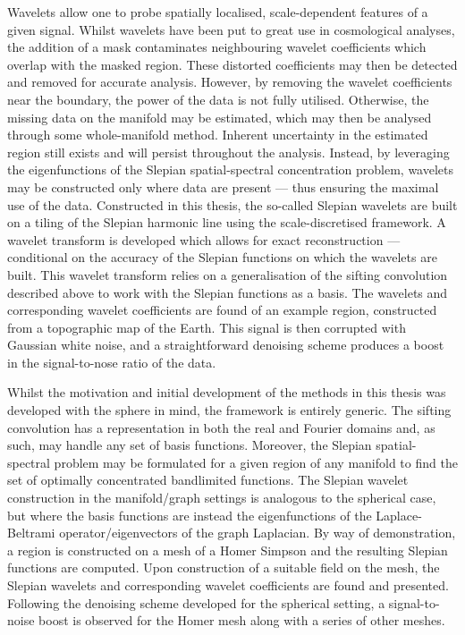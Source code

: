 Wavelets allow one to probe spatially localised, scale-dependent features of a given signal.
Whilst wavelets have been put to great use in cosmological analyses, the addition of a mask contaminates neighbouring wavelet coefficients which overlap with the masked region.
These distorted coefficients may then be detected and removed for accurate analysis.
However, by removing the wavelet coefficients near the boundary, the power of the data is not fully utilised.
Otherwise, the missing data on the manifold may be estimated, which may then be analysed through some whole-manifold method.
Inherent uncertainty in the estimated region still exists and will persist throughout the analysis.
Instead, by leveraging the eigenfunctions of the Slepian spatial-spectral concentration problem, wavelets may be constructed only where data are present --- thus ensuring the maximal use of the data.
Constructed in this thesis, the so-called Slepian wavelets are built on a tiling of the Slepian harmonic line using the scale-discretised framework.
A wavelet transform is developed which allows for exact reconstruction --- conditional on the accuracy of the Slepian functions on which the wavelets are built.
This wavelet transform relies on a generalisation of the sifting convolution described above to work with the Slepian functions as a basis.
The wavelets and corresponding wavelet coefficients are found of an example region, constructed from a topographic map of the Earth.
This signal is then corrupted with Gaussian white noise, and a straightforward denoising scheme produces a boost in the signal-to-nose ratio of the data.

Whilst the motivation and initial development of the methods in this thesis was developed with the sphere in mind, the framework is entirely generic.
The sifting convolution has a representation in both the real and Fourier domains and, as such, may handle any set of basis functions.
Moreover, the Slepian spatial-spectral problem may be formulated for a given region of any manifold to find the set of optimally concentrated bandlimited functions.
The Slepian wavelet construction in the manifold/graph settings is analogous to the spherical case, but where the basis functions are instead the eigenfunctions of the Laplace-Beltrami operator/eigenvectors of the graph Laplacian.
By way of demonstration, a region is constructed on a mesh of a Homer Simpson and the resulting Slepian functions are computed.
Upon construction of a suitable field on the mesh, the Slepian wavelets and corresponding wavelet coefficients are found and presented.
Following the denoising scheme developed for the spherical setting, a signal-to-noise boost is observed for the Homer mesh along with a series of other meshes.

